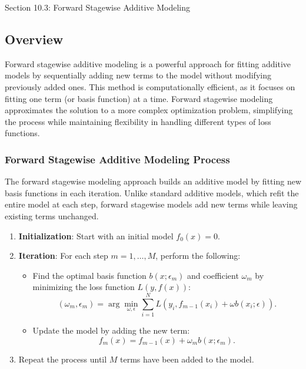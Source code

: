\begin{notes}{Section 10.3: Forward Stagewise Additive Modeling}
    \subsection*{Overview}

    Forward stagewise additive modeling is a powerful approach for fitting additive models by sequentially adding new terms to the model without modifying previously added ones. This method is 
    computationally efficient, as it focuses on fitting one term (or basis function) at a time. Forward stagewise modeling approximates the solution to a more complex optimization problem, simplifying 
    the process while maintaining flexibility in handling different types of loss functions.
    
    \subsubsection*{Forward Stagewise Additive Modeling Process}
    
    The forward stagewise modeling approach builds an additive model by fitting new basis functions in each iteration. Unlike standard additive models, which refit the entire model at each step, forward 
    stagewise models add new terms while leaving existing terms unchanged.
    
    \begin{highlight}
        \begin{enumerate}
            \item \textbf{Initialization}: Start with an initial model $f_0(x) = 0$.
            \item \textbf{Iteration}: For each step $m = 1, \dots, M$, perform the following:
            \begin{itemize}
                \item Find the optimal basis function $b(x; \epsilon_m)$ and coefficient $\omega_m$ by minimizing the loss function $L(y, f(x))$:
                \[
                (\omega_m, \epsilon_m) = \arg\min_{\omega, \epsilon} \sum_{i=1}^{N} L\left( y_i, f_{m-1}(x_i) + \omega b(x_i; \epsilon) \right).
                \]
                \item Update the model by adding the new term:
                \[
                f_m(x) = f_{m-1}(x) + \omega_m b(x; \epsilon_m).
                \]
            \end{itemize}
            \item Repeat the process until $M$ terms have been added to the model.
        \end{enumerate}
    \end{highlight}
    

\end{notes}
